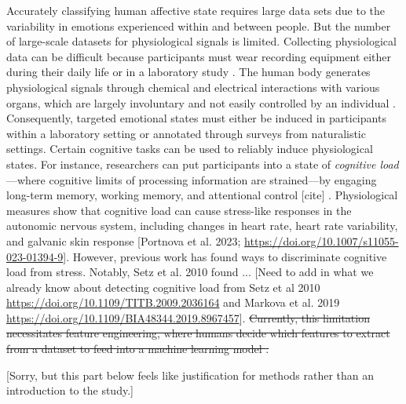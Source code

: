 \documentclass[12pt]{iopart}
\begin{document}
Accurately classifying human affective state requires large data sets due to the variability in emotions experienced within and between people. But the number of large-scale datasets for physiological signals is limited. Collecting physiological data can be difficult because participants must wear recording equipment either during their daily life or in a laboratory study \cite{gjoreski2020datasets, spathis2020learning, schmidt2018introducing, goodwin2019predicting, thayer2022effects, hosseini2022multimodal, poh2010wearable, ekiz2020can}.  The human body generates physiological signals through chemical and electrical interactions with various organs, which are largely involuntary and not easily controlled by an individual \cite{goodwin2019predicting}.  Consequently, targeted emotional states must either be induced in participants within a laboratory setting or annotated through surveys from naturalistic settings. Certain cognitive tasks can be used to reliably induce physiological states. For instance, researchers can put participants into a state of \textit{cognitive load}---where cognitive limits of processing information are strained---by engaging long-term memory, working memory, and attentional control [cite] \sout{\cite{thayer2022effects}}. Physiological measures show that cognitive load can cause stress-like responses in the autonomic nervous system, including changes in heart rate, heart rate variability, and galvanic skin response [Portnova et al. 2023; \url{https://doi.org/10.1007/s11055-023-01394-9}]. However, previous work has found ways to discriminate cognitive load from stress. Notably, Setz et al. 2010 found ... [Need to add in what we already know about detecting cognitive load from Setz et al 2010 \url{https://doi.org/10.1109/TITB.2009.2036164} and Markova et al. 2019 \url{https://doi.org/10.1109/BIA48344.2019.8967457}].
\sout{Currently, this limitation necessitates feature engineering, where humans decide which features to extract from a dataset to feed into a machine learning model \cite{picard2000affective, spathis2020learning, schmidt2018introducing, goodwin2019predicting, thayer2022effects}.  }




[Sorry, but this part below feels like justification for methods rather than an introduction to the study.]
\end{document}
